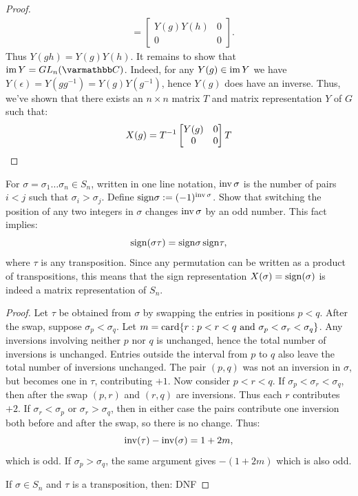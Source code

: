 \begin{proof}
\begin{align*}
			&= \begin{bmatrix} Y(g)Y(h) & 0 \\ 0 & 0 \end{bmatrix}.
		\end{align*}
		Thus $Y(gh) = Y(g)Y(h)$. It remains to show that $\Image Y = GL_n(\bfC)$. Indeed, for any $Y(g) \in \operatorname{im} Y$ we have $Y(\epsilon) = Y(g g^{-1}) = Y(g) Y(g^{-1})$, hence $Y(g)$ does have an inverse. Thus, we've shown that there exists an $n \times n$ matrix $T$ and matrix representation $Y$ of $G$ such that:
		\[
			X(g) = T^{-1} \begin{bmatrix} Y(g) & 0 \\ 0 & 0 \end{bmatrix} T\qedhere
		\]
	\end{proof}

\begin{exercise}
	For $\sigma = \sigma_1\ldots \sigma_n \in S_n$, written in one line notation, $\operatorname{inv} \sigma$ is the number of pairs $i < j$ such that $\sigma_i > \sigma_j$. Define $\mathrm{sign} \sigma := (-1)^{\operatorname{inv} \sigma}$. Show that switching the position of any two integers in $\sigma$ changes $\operatorname{inv} \sigma$ by an odd number. This fact implies:
	\[
		\mathrm{sign}(\sigma \tau) = \mathrm{sign} \sigma \, \mathrm{sign} \tau,
	\] 
	where $\tau$ is any transposition. Since any permutation can be written as a product of transpositions, this means that the sign representation $X(\sigma) = \mathrm{sign} (\sigma)$ is indeed a matrix representation of $S_n$.
\end{exercise}
	\begin{proof}
		Let $\tau$ be obtained from $\sigma$ by swapping the entries in positions $p < q$. After the swap, suppose $\sigma_p < \sigma_q$. Let $m = \operatorname{card} \{r: p < r < q \text{ and }\sigma_p < \sigma_r < \sigma_q\}$. Any inversions involving neither $p$ nor $q$ is unchanged, hence the total number of inversions is unchanged. Entries outside the interval from $p$ to $q$ also leave the total number of inversions unchanged. The pair $(p,q)$ was not an inversion in $\sigma$, but becomes one in $\tau$, contributing $+1$. Now consider $p < r < q$. If $\sigma_p < \sigma_r < \sigma_q$, then after the swap $(p,r)$ and $(r,q)$ are inversions. Thus each $r$ contributes $+2$. If $\sigma_r < \sigma_p$ or $\sigma_r > \sigma_q$, then in either case the pairs contribute one inversion both before and after the swap, so there is no change. Thus:
		\[
			\operatorname{inv}(\tau) - \operatorname{inv}(\sigma) = 1 + 2m,
		\] 
		which is odd. If $\sigma_p > \sigma_q$, the same argument gives $-(1+2m)$ which is also odd. 

		If $\sigma \in S_n$ and $\tau$ is a transposition, then:{\color{red} DNF}
	\end{proof}

